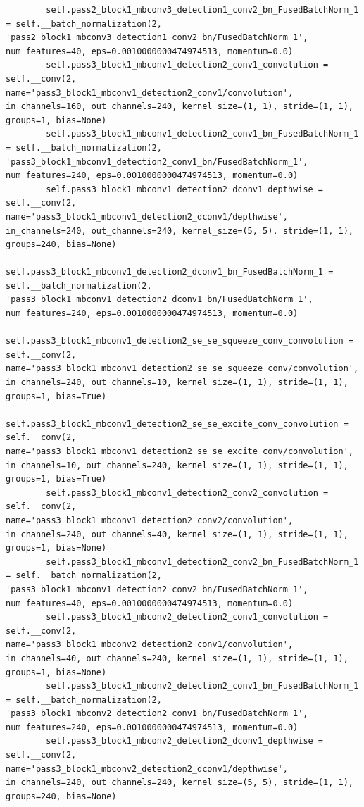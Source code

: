 \documentclass{fisatprojectfinal}
\begin{document}
\begin{appendices}
\begin{lstlisting}
        self.pass2_block1_mbconv3_detection1_conv2_bn_FusedBatchNorm_1 = self.__batch_normalization(2, 'pass2_block1_mbconv3_detection1_conv2_bn/FusedBatchNorm_1', num_features=40, eps=0.0010000000474974513, momentum=0.0)
        self.pass3_block1_mbconv1_detection2_conv1_convolution = self.__conv(2, name='pass3_block1_mbconv1_detection2_conv1/convolution', in_channels=160, out_channels=240, kernel_size=(1, 1), stride=(1, 1), groups=1, bias=None)
        self.pass3_block1_mbconv1_detection2_conv1_bn_FusedBatchNorm_1 = self.__batch_normalization(2, 'pass3_block1_mbconv1_detection2_conv1_bn/FusedBatchNorm_1', num_features=240, eps=0.0010000000474974513, momentum=0.0)
        self.pass3_block1_mbconv1_detection2_dconv1_depthwise = self.__conv(2, name='pass3_block1_mbconv1_detection2_dconv1/depthwise', in_channels=240, out_channels=240, kernel_size=(5, 5), stride=(1, 1), groups=240, bias=None)
        self.pass3_block1_mbconv1_detection2_dconv1_bn_FusedBatchNorm_1 = self.__batch_normalization(2, 'pass3_block1_mbconv1_detection2_dconv1_bn/FusedBatchNorm_1', num_features=240, eps=0.0010000000474974513, momentum=0.0)
        self.pass3_block1_mbconv1_detection2_se_se_squeeze_conv_convolution = self.__conv(2, name='pass3_block1_mbconv1_detection2_se_se_squeeze_conv/convolution', in_channels=240, out_channels=10, kernel_size=(1, 1), stride=(1, 1), groups=1, bias=True)
        self.pass3_block1_mbconv1_detection2_se_se_excite_conv_convolution = self.__conv(2, name='pass3_block1_mbconv1_detection2_se_se_excite_conv/convolution', in_channels=10, out_channels=240, kernel_size=(1, 1), stride=(1, 1), groups=1, bias=True)
        self.pass3_block1_mbconv1_detection2_conv2_convolution = self.__conv(2, name='pass3_block1_mbconv1_detection2_conv2/convolution', in_channels=240, out_channels=40, kernel_size=(1, 1), stride=(1, 1), groups=1, bias=None)
        self.pass3_block1_mbconv1_detection2_conv2_bn_FusedBatchNorm_1 = self.__batch_normalization(2, 'pass3_block1_mbconv1_detection2_conv2_bn/FusedBatchNorm_1', num_features=40, eps=0.0010000000474974513, momentum=0.0)
        self.pass3_block1_mbconv2_detection2_conv1_convolution = self.__conv(2, name='pass3_block1_mbconv2_detection2_conv1/convolution', in_channels=40, out_channels=240, kernel_size=(1, 1), stride=(1, 1), groups=1, bias=None)
        self.pass3_block1_mbconv2_detection2_conv1_bn_FusedBatchNorm_1 = self.__batch_normalization(2, 'pass3_block1_mbconv2_detection2_conv1_bn/FusedBatchNorm_1', num_features=240, eps=0.0010000000474974513, momentum=0.0)
        self.pass3_block1_mbconv2_detection2_dconv1_depthwise = self.__conv(2, name='pass3_block1_mbconv2_detection2_dconv1/depthwise', in_channels=240, out_channels=240, kernel_size=(5, 5), stride=(1, 1), groups=240, bias=None)

\end{lstlisting}
\end{appendices}
\end{document}
